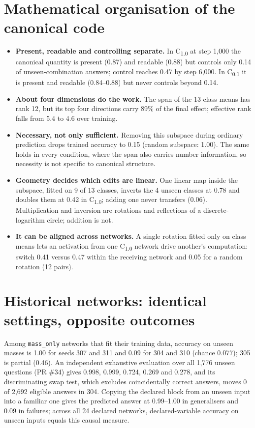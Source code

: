 \documentclass[11pt]{article}
\newcommand{\Cten}{C\textsubscript{1.0}}
\newcommand{\Cone}{C\textsubscript{0.1}}
\begin{document}
\section{Mathematical organisation of the canonical code}
\begin{itemize}[leftmargin=*,itemsep=1pt]
\item \textbf{Present, readable and controlling separate.} In \Cten{} at step 1,000 the canonical quantity is present
(0.87) and readable (0.88) but controls only 0.14 of unseen-combination answers; control reaches 0.47 by step 6,000.
In \Cone{} it is present and readable (0.84--0.88) but never controls beyond 0.14.
\item \textbf{About four dimensions do the work.} The span of the 13 class means has rank 12, but its top four
directions carry 89\% of the final effect; effective rank falls from 5.4 to 4.6 over training.
\item \textbf{Necessary, not only sufficient.} Removing this subspace during ordinary prediction drops trained accuracy
to 0.15 (random subspace: 1.00). The same holds in every condition, where the span also carries number information,
so necessity is not specific to canonical structure.
\item \textbf{Geometry decides which edits are linear.} One linear map inside the subspace, fitted on 9 of 13 classes,
inverts the 4 unseen classes at 0.78 and doubles them at 0.42 in \Cten{}; adding one never transfers (0.06).
Multiplication and inversion are rotations and reflections of a discrete-logarithm circle; addition is not.
\item \textbf{It can be aligned across networks.} A single rotation fitted only on class means lets an activation from
one \Cten{} network drive another's computation: switch 0.41 versus 0.47 within the receiving network and 0.05 for a
random rotation (12 pairs).
\end{itemize}

\section{Historical networks: identical settings, opposite outcomes}
Among \texttt{mass\_only} networks that fit their training data, accuracy on unseen masses is 1.00 for seeds 307 and
311 and 0.09 for 304 and 310 (chance 0.077); 305 is partial (0.46). An independent exhaustive evaluation over all
1,776 unseen questions (PR \#34) gives 0.998, 0.999, 0.724, 0.269 and 0.278, and its discriminating swap test, which
excludes coincidentally correct answers, moves 0 of 2,692 eligible answers in 304. Copying the declared block from an
unseen input into a familiar one gives the predicted answer at 0.99--1.00 in generalisers and 0.09 in failures; across
all 24 declared networks, declared-variable accuracy on unseen inputs equals this causal measure.
\end{document}
